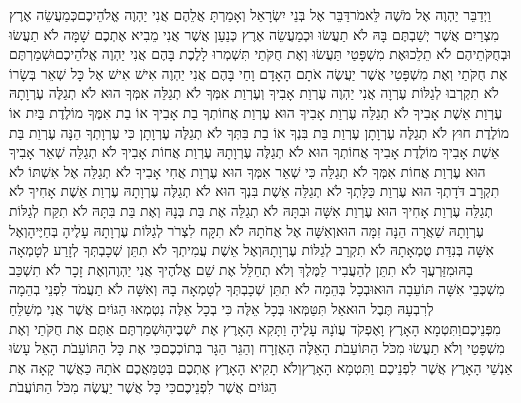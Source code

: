 \documentclass[../main/main.tex]{subfiles}
\begin{document}
\begin{multicols*}{\ncols}
וַיְדַבֵּר יַהְוֶה אֶל מֹשֶׁה לֵּאמֹר\PreVerseSpace{}דַּבֵּר אֶל בְּנֵי יִשְׂרָאֵל וְאָמַרְתָּ אֲלֵהֶם אֲנִי יַהְוֶה אֱלֹהֵיכֶם\PreVerseSpace{}כְּמַעֲשֵׂה אֶרֶץ מִצְרַיִם אֲשֶׁר יְשַׁבְתֶּם בָּהּ לֹא תַעֲשׂוּ וּכְמַעֲשֵׂה אֶרֶץ כְּנַעַן אֲשֶׁר אֲנִי מֵבִיא אֶתְכֶם שָׁמָּה לֹא תַעֲשׂוּ וּבְחֻקֹּתֵיהֶם לֹא תֵלֵכוּ\PreVerseSpace{}אֶת מִשְׁפָּטַי תַּעֲשׂוּ וְאֶת חֻקֹּתַי תִּשְׁמְרוּ לָלֶכֶת בָּהֶם אֲנִי יַהְוֶה אֱלֹהֵיכֶם\PreVerseSpace{}וּשְׁמַרְתֶּם אֶת חֻקֹּתַי וְאֶת מִשְׁפָּטַי אֲשֶׁר יַעֲשֶׂה אֹתָם הָאָדָם וָחַי בָּהֶם אֲנִי יַהְוֶה \ClosedSection{}אִישׁ אִישׁ אֶל כָּל שְׁאֵר בְּשָׂרוֹ לֹא תִקְרְבוּ לְגַלּוֹת עֶרְוָה אֲנִי יַהְוֶה \ClosedSection{}עֶרְוַת אָבִיךָ וְעֶרְוַת אִמְּךָ לֹא תְגַלֵּה אִמְּךָ הוּא לֹא תְגַלֶּה עֶרְוָתָהּ \ClosedSection{}עֶרְוַת אֵשֶׁת אָבִיךָ לֹא תְגַלֵּה עֶרְוַת אָבִיךָ הוּא \ClosedSection{}עֶרְוַת אֲחוֹתְךָ בַת אָבִיךָ אוֹ בַת אִמֶּךָ מוֹלֶדֶת בַּיִת אוֹ מוֹלֶדֶת חוּץ לֹא תְגַלֶּה עֶרְוָתָן \ClosedSection{}עֶרְוַת בַּת בִּנְךָ אוֹ בַת בִּתְּךָ לֹא תְגַלֶּה עֶרְוָתָן כִּי עֶרְוָתְךָ הֵנָּה \ClosedSection{}עֶרְוַת בַּת אֵשֶׁת אָבִיךָ מוֹלֶדֶת אָבִיךָ אֲחוֹתְךָ הוּא לֹא תְגַלֶּה עֶרְוָתָהּ \ClosedSection{}עֶרְוַת אֲחוֹת אָבִיךָ לֹא תְגַלֵּה שְׁאֵר אָבִיךָ הוּא \ClosedSection{}עֶרְוַת אֲחוֹת אִמְּךָ לֹא תְגַלֵּה כִּי שְׁאֵר אִמְּךָ הוּא \ClosedSection{}עֶרְוַת אֲחִי אָבִיךָ לֹא תְגַלֵּה אֶל אִשְׁתּוֹ לֹא תִקְרָב דֹּדָתְךָ הוּא \ClosedSection{}עֶרְוַת כַּלָּתְךָ לֹא תְגַלֵּה אֵשֶׁת בִּנְךָ הוּא לֹא תְגַלֶּה עֶרְוָתָהּ \ClosedSection{}עֶרְוַת אֵשֶׁת אָחִיךָ לֹא תְגַלֵּה עֶרְוַת אָחִיךָ הוּא \ClosedSection{}עֶרְוַת אִשָּׁה וּבִתָּהּ לֹא תְגַלֵּה אֶת בַּת בְּנָהּ וְאֶת בַּת בִּתָּהּ לֹא תִקַּח לְגַלּוֹת עֶרְוָתָהּ שַׁאֲרָה הֵנָּה זִמָּה הוּא\PreVerseSpace{}וְאִשָּׁה אֶל אֲחֹתָהּ לֹא תִקָּח לִצְרֹר לְגַלּוֹת עֶרְוָתָהּ עָלֶיהָ בְּחַיֶּיהָ\PreVerseSpace{}וְאֶל אִשָּׁה בְּנִדַּת טֻמְאָתָהּ לֹא תִקְרַב לְגַלּוֹת עֶרְוָתָהּ\PreVerseSpace{}וְאֶל אֵשֶׁת עֲמִיתְךָ לֹא תִתֵּן שְׁכָבְתְּךָ לְזָרַע לְטָמְאָה בָהּ\PreVerseSpace{}וּמִזַּרְעֲךָ לֹא תִתֵּן לְהַעֲבִיר לַמֶּלֶךְ וְלֹא תְחַלֵּל אֶת שֵׁם אֱלֹהֶיךָ אֲנִי יַהְוֶה\PreVerseSpace{}וְאֶת זָכָר לֹא תִשְׁכַּב מִשְׁכְּבֵי אִשָּׁה תּוֹעֵבָה הוּא\PreVerseSpace{}וּבְכָל בְּהֵמָה לֹא תִתֵּן שְׁכָבְתְּךָ לְטָמְאָה בָהּ וְאִשָּׁה לֹא תַעֲמֹד לִפְנֵי בְהֵמָה לְרִבְעָהּ תֶּבֶל הוּא\PreVerseSpace{}אַל תִּטַּמְּאוּ בְּכָל אֵלֶּה כִּי בְכָל אֵלֶּה נִטְמְאוּ הַגּוֹיִם אֲשֶׁר אֲנִי מְשַׁלֵּחַ מִפְּנֵיכֶם\PreVerseSpace{}וַתִּטְמָא הָאָרֶץ וָאֶפְקֹד עֲוֺנָהּ עָלֶיהָ וַתָּקִא הָאָרֶץ אֶת יֹשְׁבֶיהָ\PreVerseSpace{}וּשְׁמַרְתֶּם אַתֶּם אֶת חֻקֹּתַי וְאֶת מִשְׁפָּטַי וְלֹא תַעֲשׂוּ מִכֹּל הַתּוֹעֵבֹת הָאֵלֶּה הָאֶזְרָח וְהַגֵּר הַגָּר בְּתוֹכְכֶם\PreVerseSpace{}כִּי אֶת כָּל הַתּוֹעֵבֹת הָאֵל עָשׂוּ אַנְשֵׁי הָאָרֶץ אֲשֶׁר לִפְנֵיכֶם וַתִּטְמָא הָאָרֶץ\PreVerseSpace{}וְלֹא תָקִיא הָאָרֶץ אֶתְכֶם בְּטַמַּאֲכֶם אֹתָהּ כַּאֲשֶׁר קָאָה אֶת הַגּוֹיִם\SubEnd{} אֲשֶׁר לִפְנֵיכֶם\PreVerseSpace{}כִּי כָּל אֲשֶׁר יַעֲשֶׂה מִכֹּל הַתּוֹעֲבֹת 
\end{multicols*}
\end{document}
